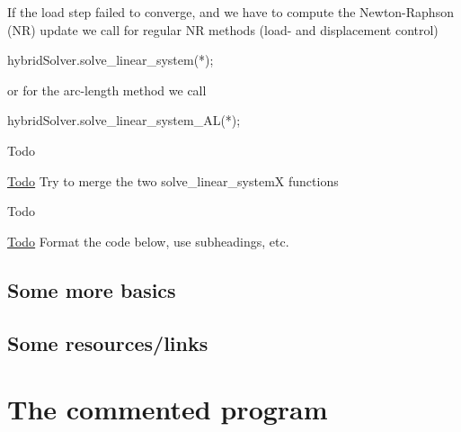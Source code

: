 \begin{DoxyItemize}
\item If the load step failed to converge, and we have to compute the Newton-\/\+Raphson (NR) update we call for regular NR methods (load-\/ and displacement control) 
\begin{DoxyCode}
hybridSolver.solve\_linear\_system(*);
\end{DoxyCode}
 or for the arc-\/length method we call 
\begin{DoxyCode}
hybridSolver.solve\_linear\_system\_AL(*);
\end{DoxyCode}
 \begin{DoxyRefDesc}{Todo}
\item[\hyperlink{todo__todo000004}{Todo}]Try to merge the two solve\+\_\+linear\+\_\+systemX functions\end{DoxyRefDesc}

\end{DoxyItemize}

\begin{DoxyRefDesc}{Todo}
\item[\hyperlink{todo__todo000005}{Todo}]Format the code below, use subheadings, etc.\end{DoxyRefDesc}
\hypertarget{index_subsec_more_basics}{}\subsection{Some more basics}\label{index_subsec_more_basics}
\hypertarget{index_subsec_resources}{}\subsection{Some resources/links}\label{index_subsec_resources}
\hypertarget{index_code}{}\section{The commented program}\label{index_code}

